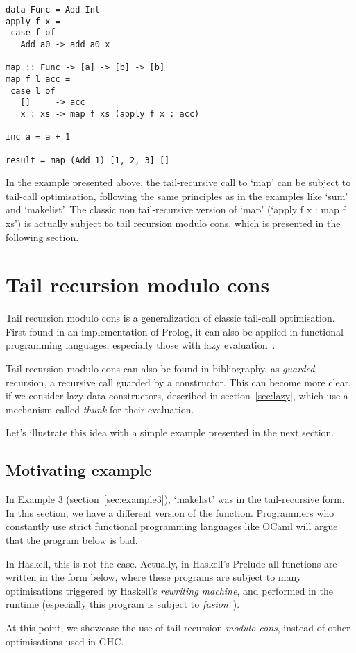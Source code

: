 \documentclass[diploma]{softlab-thesis}
\begin{document}
\begin{verbatim}
data Func = Add Int
apply f x =
 case f of
   Add a0 -> add a0 x

map :: Func -> [a] -> [b] -> [b]
map f l acc =
 case l of
   []     -> acc
   x : xs -> map f xs (apply f x : acc)

inc a = a + 1

result = map (Add 1) [1, 2, 3] []
\end{verbatim}
In the example presented above, 
the tail-recursive call to `map' can be subject to tail-call optimisation, 
following the same principles as in the examples like `sum' and `makelist'. The classic non tail-recursive 
version of `map' (`apply f x : map f xs') is actually subject to tail recursion modulo cons, which is presented 
in the following section.

\section{Tail recursion modulo cons}
\label{sec:modulo-cons-example}

Tail recursion modulo cons is a generalization of classic tail-call optimisation. First found in an 
implementation of Prolog, it can also be applied in
functional programming languages, especially those with lazy evaluation~\cite{Wadler84}.

Tail recursion modulo cons can also be found in bibliography, as \textit{guarded} recursion, 
a recursive call guarded by a constructor. This can become more clear, if we consider lazy data constructors, 
described in section~\ref{sec:lazy}, which use a mechanism called \textit{thunk} for their evaluation.

Let's illustrate this idea with a simple example presented in the next section.

\subsection {Motivating example}
In Example 3 (section~\ref{sec:example3}), `makelist' was in the tail-recursive 
form. In this section, we have a different version of the function. 
Programmers who constantly use strict functional programming languages like OCaml 
will argue that the program below is bad. 

In Haskell, this is not the case. Actually, in Haskell's Prelude all functions are written 
in the form below, where these programs are subject to many optimisations triggered 
by Haskell's \textit{rewriting machine}, and performed in the runtime 
(especially this program is subject to \textit{fusion}~\cite{Coutts07}). 
\newline
\par At this point, we showcase the use of tail recursion \textit{modulo cons}, instead of other optimisations
used in GHC.
\end{document}
